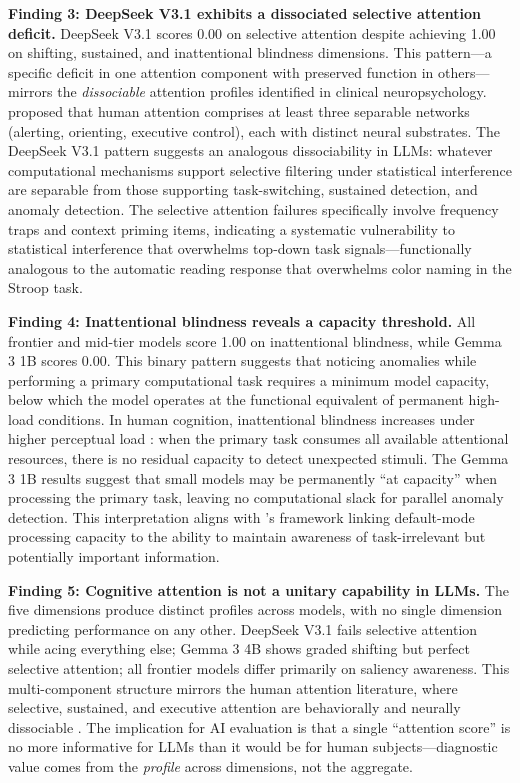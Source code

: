 \documentclass{article}
\begin{document}
\textbf{Finding 3: DeepSeek V3.1 exhibits a dissociated selective attention deficit.} DeepSeek V3.1 scores 0.00 on selective attention despite achieving 1.00 on shifting, sustained, and inattentional blindness dimensions. This pattern---a specific deficit in one attention component with preserved function in others---mirrors the \emph{dissociable} attention profiles identified in clinical neuropsychology. \citet{posner1990} proposed that human attention comprises at least three separable networks (alerting, orienting, executive control), each with distinct neural substrates. The DeepSeek V3.1 pattern suggests an analogous dissociability in LLMs: whatever computational mechanisms support selective filtering under statistical interference are separable from those supporting task-switching, sustained detection, and anomaly detection. The selective attention failures specifically involve frequency traps and context priming items, indicating a systematic vulnerability to statistical interference that overwhelms top-down task signals---functionally analogous to the automatic reading response that overwhelms color naming in the Stroop task.

\textbf{Finding 4: Inattentional blindness reveals a capacity threshold.} All frontier and mid-tier models score 1.00 on inattentional blindness, while Gemma 3 1B scores 0.00. This binary pattern suggests that noticing anomalies while performing a primary computational task requires a minimum model capacity, below which the model operates at the functional equivalent of permanent high-load conditions. In human cognition, inattentional blindness increases under higher perceptual load \citep{lavie1995,mack1998}: when the primary task consumes all available attentional resources, there is no residual capacity to detect unexpected stimuli. The Gemma 3 1B results suggest that small models may be permanently ``at capacity'' when processing the primary task, leaving no computational slack for parallel anomaly detection. This interpretation aligns with \citet{buckner2008}'s framework linking default-mode processing capacity to the ability to maintain awareness of task-irrelevant but potentially important information.

\textbf{Finding 5: Cognitive attention is not a unitary capability in LLMs.} The five dimensions produce distinct profiles across models, with no single dimension predicting performance on any other. DeepSeek V3.1 fails selective attention while acing everything else; Gemma 3 4B shows graded shifting but perfect selective attention; all frontier models differ primarily on saliency awareness. This multi-component structure mirrors the human attention literature, where selective, sustained, and executive attention are behaviorally and neurally dissociable \citep{posner1990,diamond2013}. The implication for AI evaluation is that a single ``attention score'' is no more informative for LLMs than it would be for human subjects---diagnostic value comes from the \emph{profile} across dimensions, not the aggregate.
\end{document}
